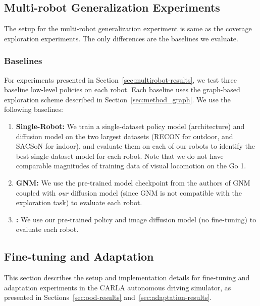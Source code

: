 \subsection{Multi-robot Generalization Experiments}

The setup for the multi-robot generalization experiment is same as the coverage exploration experiments. The only differences are the baselines we evaluate.


\subsubsection{Baselines}
For experiments presented in Section~\ref{sec:multirobot-results}, we test three baseline low-level policies on each robot. Each baseline uses the graph-based exploration scheme described in Section~\ref{sec:method_graph}. We use the following baselines:
\begin{enumerate}
    \item \textbf{Single-Robot:} We train a single-dataset policy model (\ModelName architecture) and diffusion model on the two largest datasets (RECON for outdoor, and SACSoN for indoor), and evaluate them on each of our robots to identify the best single-dataset model for each robot. Note that we do not have comparable magnitudes of training data of visual locomotion on the Go 1.
    \item \textbf{GNM:} We use the pre-trained model checkpoint from the authors of GNM~\cite{shah2022gnm} coupled with \emph{our} diffusion model (since GNM is not compatible with the exploration task) to evaluate each robot.
    \item \textbf{\ModelName:} We use our pre-trained \ModelName policy and image diffusion model (no fine-tuning) to evaluate each robot.
\end{enumerate}


\subsection{Fine-tuning and Adaptation}
\label{sec:app:evaluation_carla}

This section describes the setup and implementation details for \ModelName fine-tuning and adaptation experiments in the CARLA autonomous driving simulator, as presented in Sections~\ref{sec:ood-results} and~\ref{sec:adaptation-results}.

